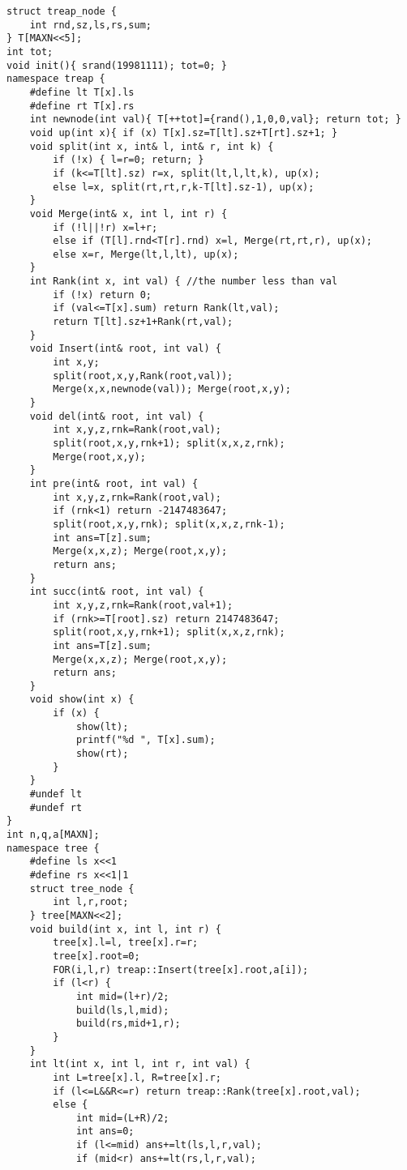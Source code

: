 \begin{lstlisting}
struct treap_node {
    int rnd,sz,ls,rs,sum;
} T[MAXN<<5];
int tot;
void init(){ srand(19981111); tot=0; }
namespace treap {
    #define lt T[x].ls
    #define rt T[x].rs
    int newnode(int val){ T[++tot]={rand(),1,0,0,val}; return tot; }
    void up(int x){ if (x) T[x].sz=T[lt].sz+T[rt].sz+1; }
    void split(int x, int& l, int& r, int k) {
        if (!x) { l=r=0; return; }
        if (k<=T[lt].sz) r=x, split(lt,l,lt,k), up(x);
        else l=x, split(rt,rt,r,k-T[lt].sz-1), up(x);
    }
    void Merge(int& x, int l, int r) {
        if (!l||!r) x=l+r;
        else if (T[l].rnd<T[r].rnd) x=l, Merge(rt,rt,r), up(x);
        else x=r, Merge(lt,l,lt), up(x);
    }
    int Rank(int x, int val) { //the number less than val
        if (!x) return 0;
        if (val<=T[x].sum) return Rank(lt,val);
        return T[lt].sz+1+Rank(rt,val);
    }
    void Insert(int& root, int val) {
        int x,y;
        split(root,x,y,Rank(root,val));
        Merge(x,x,newnode(val)); Merge(root,x,y);
    }
    void del(int& root, int val) {
        int x,y,z,rnk=Rank(root,val);
        split(root,x,y,rnk+1); split(x,x,z,rnk);
        Merge(root,x,y);
    }
    int pre(int& root, int val) {
        int x,y,z,rnk=Rank(root,val);
        if (rnk<1) return -2147483647;
        split(root,x,y,rnk); split(x,x,z,rnk-1);
        int ans=T[z].sum;
        Merge(x,x,z); Merge(root,x,y);
        return ans;
    }
    int succ(int& root, int val) {
        int x,y,z,rnk=Rank(root,val+1);
        if (rnk>=T[root].sz) return 2147483647;
        split(root,x,y,rnk+1); split(x,x,z,rnk);
        int ans=T[z].sum;
        Merge(x,x,z); Merge(root,x,y);
        return ans;
    }
    void show(int x) {
        if (x) {
            show(lt);
            printf("%d ", T[x].sum);
            show(rt);
        }
    }
    #undef lt
    #undef rt
}
int n,q,a[MAXN];
namespace tree {
    #define ls x<<1
    #define rs x<<1|1
    struct tree_node {
        int l,r,root;
    } tree[MAXN<<2];
    void build(int x, int l, int r) {
        tree[x].l=l, tree[x].r=r;
        tree[x].root=0;
        FOR(i,l,r) treap::Insert(tree[x].root,a[i]);
        if (l<r) {
            int mid=(l+r)/2;
            build(ls,l,mid);
            build(rs,mid+1,r);
        }
    }
    int lt(int x, int l, int r, int val) {
        int L=tree[x].l, R=tree[x].r;
        if (l<=L&&R<=r) return treap::Rank(tree[x].root,val);
        else {
            int mid=(L+R)/2;
            int ans=0;
            if (l<=mid) ans+=lt(ls,l,r,val);
            if (mid<r) ans+=lt(rs,l,r,val);

\end{lstlisting}
